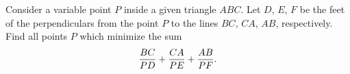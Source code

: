 Consider a variable point $P$ inside a given triangle $ABC$. Let $D$,  $E$,  $F$ be the feet of the perpendiculars from the point $P$ to the lines $BC$,  $CA$,  $AB$,  respectively. Find all points $P$ which minimize the sum \[ {BC\over PD}+{CA\over PE}+{AB\over PF}.  \]
